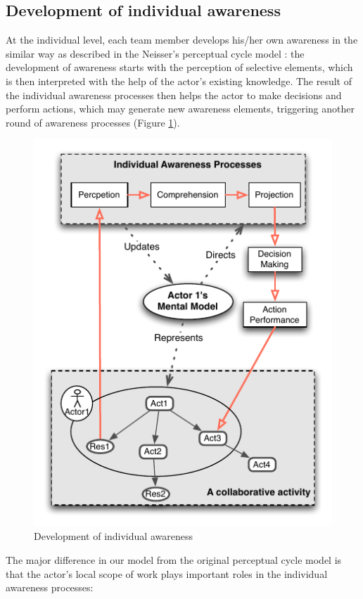 \subsection{Development of individual awareness} %
\label{sub:development_of_individual_awareness}
At the individual level, each team member develops his/her own awareness in the similar way as described in the Neisser's perceptual cycle model \cite{neisser1976cognition}: the development of awareness starts with the perception of selective elements, which is then interpreted with the help of the actor's existing knowledge. The result of the individual awareness processes then helps the actor to make decisions and perform actions, which may generate new awareness elements, triggering another round of awareness processes (Figure \ref{fig:individual_processes}). 

\begin{figure}[htbp] %
   \centering
   \includegraphics{individual_processes.pdf} 
   \caption{Development of individual awareness}
   \label{fig:individual_processes}
\end{figure}

The major difference in our model from the original perceptual cycle model is that the actor's local scope of work plays important roles in the individual awareness processes:

